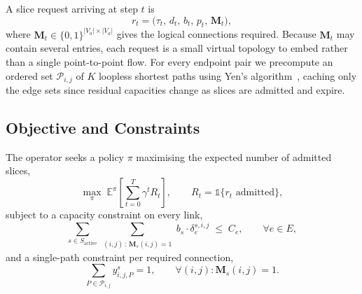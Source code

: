 \documentclass[10pt,journal,comsoc]{IEEEtran}
\begin{document}
A slice request arriving at step $t$ is
\begin{equation}
r_t = \bigl( \tau_t,\, d_t,\, b_t,\, p_t,\, \mathbf{M}_t \bigr),
\label{eq:request}
\end{equation}
where $\mathbf{M}_t \in \{0,1\}^{|V_a|\times|V_a|}$ gives the logical
connections required. Because $\mathbf{M}_t$ may contain several entries,
each request is a small virtual topology to embed rather than a single
point-to-point flow. For every endpoint pair we precompute an ordered set
$\mathcal{P}_{i,j}$ of $K$ loopless shortest paths using Yen's
algorithm~\cite{yen1971finding}, caching only the edge sets since residual
capacities change as slices are admitted and expire.

\subsection{Objective and Constraints}
The operator seeks a policy $\pi$ maximising the expected number of
admitted slices,
\begin{equation}
\label{eq:objective}
\max_{\pi} \; \mathbb{E}^{\pi}\!\left[ \sum_{t=0}^{T} \gamma^{t} R_t \right],
\qquad
R_t = \mathbb{1}\{r_t \text{ admitted}\},
\end{equation}
subject to a capacity constraint on every link,
\begin{equation}
\label{eq:capacity}
\sum_{s \in S_{\text{active}}}
\sum_{\substack{(i,j)\,:\,\mathbf{M}_s(i,j)=1}}
b_s \cdot \delta^{s,i,j}_e \;\leq\; C_e,
\qquad \forall e \in E,
\end{equation}
and a single-path constraint per required connection,
\begin{equation}
\label{eq:pathselection}
\sum_{P \in \mathcal{P}_{i,j}} y^{s}_{i,j,P} = 1,
\qquad \forall (i,j) : \mathbf{M}_s(i,j)=1 .
\end{equation}
\end{document}

